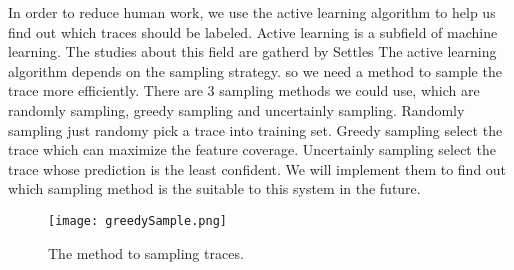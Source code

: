 In order to reduce human work,
we use the active learning algorithm to help us find out which traces should be labeled.
Active learning is a subfield of machine learning.
The studies about this field are gatherd by Settles\cite{ActiveLearning}
The active learning algorithm depends on the sampling strategy.
so we need a method to sample the trace more efficiently.
There are 3 sampling methods we could use, which are randomly sampling, greedy sampling and uncertainly sampling.
Randomly sampling just randomy pick a trace into training set.
Greedy sampling select the trace which can maximize the feature coverage.
Uncertainly sampling  select the trace whose prediction is the least confident.
We will implement them to find out which sampling method is the suitable to this system in the future.


\begin{figure}[ht]
	\graphicspath{{pic/}}
	\begin{center}
		\texttt{[image: greedySample.png]}
	\end{center}
	\caption{ The method to sampling traces. }
	\label{greedySample}
\end{figure}


